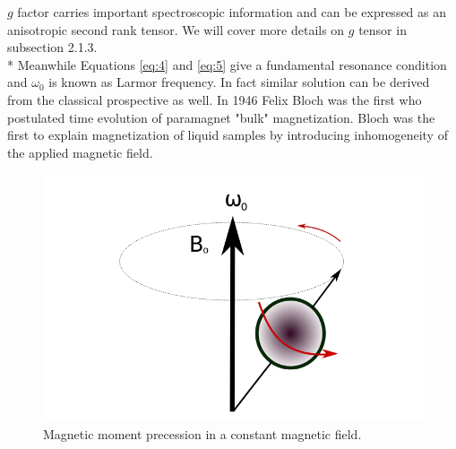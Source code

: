 $g$ factor carries important spectroscopic information and can be expressed as an anisotropic second rank tensor. We will cover more details on $g$ tensor in subsection 2.1.3.\\*
Meanwhile Equations \ref{eq:4} and \ref{eq:5} give a fundamental resonance condition and $\omega_0$ is known as Larmor frequency. In fact similar solution can be derived from the classical prospective as well. In 1946 Felix Bloch was the first who postulated time evolution of paramagnet "bulk" magnetization. Bloch was the first to explain magnetization of liquid samples by introducing inhomogeneity of the applied magnetic field. 
\begin{figure}[h]
\begin{center}
\includegraphics[scale=0.5]{figures/chap1/prec.png}
\caption{Magnetic moment precession in a constant magnetic field.}
\end{center}
\end{figure}

